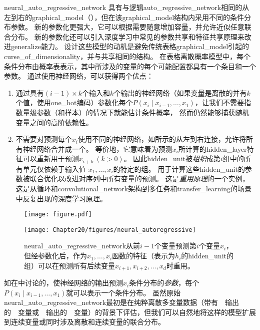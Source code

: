 \gls{neural_auto_regressive_network} \citep{Bengio+Bengio-trnn2000,Bengio+Bengio-NIPS2000}具有与逻辑\gls{auto_regressive_network}相同的从左到右的\gls{graphical_model}（），但在该\gls{graphical_model}结构内采用不同的条件分布参数。
新的参数化更强大，它可以根据需要随意增加容量，并允许近似任意联合分布。
新的参数化还可以引入深度学习中常见的参数共享和特征共享原理来改进\gls{generalize}能力。
设计这些模型的动机是避免传统表格\gls{graphical_model}引起的\gls{curse_of_dimensionality}，并与共享相同的结构。
在表格离散概率模型中，每个条件分布由概率表表示，其中所涉及的变量的每个可能配置都具有一个条目和一个参数。
通过使用神经网络，可以获得两个优点：
\begin{enumerate}
 \item 通过具有$(i-1) \times k$个输入和$k$个输出的神经网络（如果变量是离散的并有$k$个值，使用\gls{one_hot}编码）参数化每个$P(x_i  \mid  x_{i-1}, \dots, x_1)$，让我们不需要指数量级参数（和样本）的情况下就能估计条件概率， 然而仍然能够捕获随机变量之间的高阶依赖性。

 \item 不需要对预测每个$x_i$使用不同的神经网络，如所示的从左到右连接，允许将所有神经网络合并成一个。
 等价地，它意味着为预测$x_i$所计算的\gls{hidden_layer}特征可以重新用于预测$x_{i+k}~(k > 0)$。
 因此\gls{hidden_unit}被\emph{组织}成第$i$组中的所有单元仅依赖于输入值 $x_1, \dots, x_i$的特定的组。
 用于计算这些\gls{hidden_unit}的参数被联合优化以改进对序列中所有变量的预测。
 这是\emph{重用原理}的一个实例，这是从循环和\gls{convolutional_network}架构到多任务和\gls{transfer_learning}的场景中反复出现的深度学习原理。

\end{enumerate}

\begin{figure}[!htb]
\ifOpenSource
\centerline{\texttt{[image: figure.pdf]}}
\else
\centerline{\texttt{[image: Chapter20/figures/neural\_autoregressive]}}
\fi
\caption{\gls{neural_auto_regressive_network}从前$i-1$个变量预测第$i$个变量$x_i$，但经参数化后，作为$x_1,\dots,x_i$函数的特征（表示为$h_i$的\gls{hidden_unit}的组）可以在预测所有后续变量$x_{i+1},x_{i+2},\dots,x_{d}$时重用。
}
\label{fig:chap20_neural_autoregressive}
\end{figure}


如在中讨论的，使神经网络的输出预测$x_i$条件分布的\emph{参数}，每个$P(x_i  \mid  x_{i-1}, \dots, x_1)$就可以表示一个条件分布。
虽然原始\gls{neural_auto_regressive_network}最初是在纯粹离散多变量数据（带有~~输出的~~变量或~~输出的~~变量）的背景下评估，但我们可以自然地将这样的模型扩展到连续变量或同时涉及离散和连续变量的联合分布。


